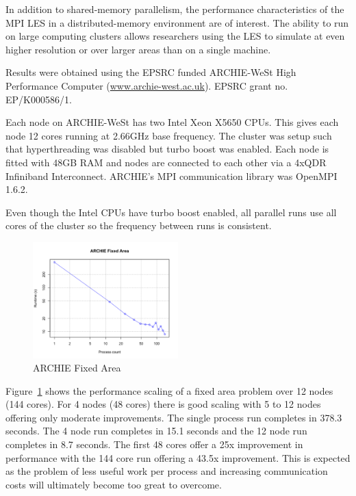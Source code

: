 In addition to shared-memory parallelism, the performance characteristics of the
MPI LES in a distributed-memory environment are of interest. The ability to run
on large computing clusters allows researchers using the LES to simulate at even
higher resolution or over larger areas than on a single machine.

Results were obtained using the EPSRC funded ARCHIE-WeSt High Performance
Computer (\url{www.archie-west.ac.uk}). EPSRC grant no. EP/K000586/1.

Each node on ARCHIE-WeSt has two Intel Xeon X5650 CPUs. This gives each node 12
cores running at 2.66GHz base frequency. The cluster was setup such that
hyperthreading was disabled but turbo boost was enabled. Each node is fitted
with 48GB RAM and nodes are connected to each other via a 4xQDR Infiniband
Interconnect. ARCHIE's MPI communication library was OpenMPI 1.6.2.

Even though the Intel CPUs have turbo boost enabled, all parallel runs use all
cores of the cluster so the frequency between runs is consistent.

\begin{figure}[h]
    \includegraphics[width=0.5\textwidth]{graphs/ARCHIE-fixed-area.png}
    \caption{ARCHIE Fixed Area}
    \label{fig:archiefixedarea}
\end{figure}

Figure~\ref{fig:archiefixedarea} shows the performance scaling of a fixed area
problem over 12 nodes (144 cores). For 4 nodes (48 cores) there is good scaling
with 5 to 12 nodes offering only moderate improvements. The single process run
completes in 378.3 seconds. The 4 node run completes in 15.1 seconds and the 12
node run completes in 8.7 seconds. The first 48 cores offer a 25x improvement in
performance with the 144 core run offering a 43.5x improvement. This is expected
as the problem of less useful work per process and increasing communication
costs will ultimately become too great to overcome.

